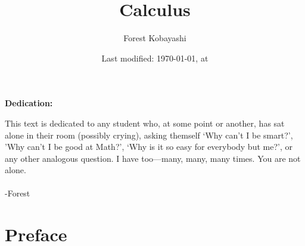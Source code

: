 \documentclass[10pt]{article}
\theoremstyle{definition}
\begin{document}
\pagestyle{fancy}

\setlength{\headheight}{0pt}
\setlength\parindent{0pt}


\setlength{\headheight}{0pt}
\pretitle{\begin{center}\Huge\bfseries}
\posttitle{\par\end{center}\vskip 0.5em}
\preauthor{\begin{center}\Large\ttfamily}
\postauthor{\end{center}}
\predate{\par\large\centering}
\postdate{\par}

\title{Calculus}
\author{Forest Kobayashi}
\date{Last modified: \today, at \the\time}
\maketitle
\thispagestyle{empty}
\clearpage
\vspace{5cm}
\begin{center}
\Large\bfseries Dedication:
\end{center}
{\large%
This text is dedicated to any student who, at some point or another, has sat alone in their room (possibly crying), asking themself `Why can't I be smart?', 'Why can't I be good at Math?', `Why is it so easy for everybody but me?', or any other analogous question.  I have too---many, many, many times.  You are not alone. \\~\\ -Forest}%
\thispagestyle{empty}
\clearpage
\tableofcontents
\clearpage
\pagestyle{fancy}
\section{Preface}
\end{document}
